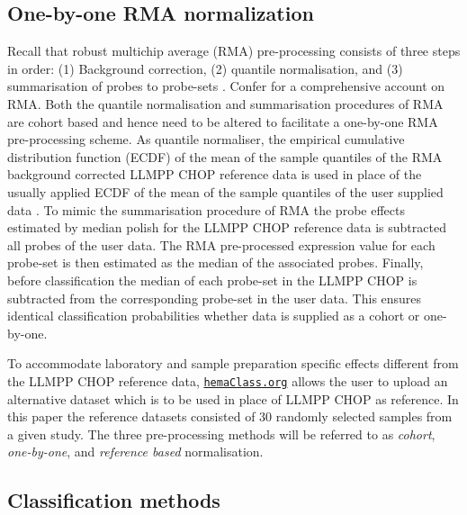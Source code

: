 \documentclass{bmcart}
\newcommand{\hemaClass}{\href{http://hemaClass.org}{\texttt{hemaClass.org}}}
\begin{document}
\subsection{One-by-one RMA normalization}
Recall that robust multichip average (RMA) pre-processing consists of three steps in order:
(1) Background correction,
(2) quantile normalisation, and
(3) summarisation of probes to probe-sets \citep{Irizarry2003}.
Confer \citet{Bolstad2004} for a comprehensive account on RMA.
Both the quantile normalisation and summarisation procedures of RMA are cohort based and hence need to be altered to facilitate a one-by-one RMA pre-processing scheme.
As quantile normaliser, the empirical cumulative distribution function (ECDF) of the mean of the sample quantiles of the RMA background corrected LLMPP CHOP reference data is used in place of the usually applied ECDF of the mean of the sample quantiles of the user supplied data \citep{Bolstad2003}.
To mimic the summarisation procedure of RMA \citep{Irizarry2003b} the probe effects estimated by median polish for the LLMPP CHOP reference data is subtracted all probes of the user data.
The RMA pre-processed expression value for each probe-set is then estimated as the median of the associated probes.
Finally, before classification the median of each probe-set in the LLMPP CHOP is subtracted from the corresponding probe-set in the user data.
This ensures identical classification probabilities whether data is supplied as a cohort or one-by-one.

To accommodate laboratory and sample preparation specific effects different from the LLMPP CHOP reference data, \hemaClass{} allows the user to upload an alternative dataset which is to be used in place of LLMPP CHOP as reference.
In this paper the reference datasets consisted of $30$ randomly selected samples from a given study.
The three pre-processing methods will be referred to as \emph{cohort}, \emph{one-by-one}, and \emph{reference based} normalisation.



\subsection{Classification methods}
\end{document}
